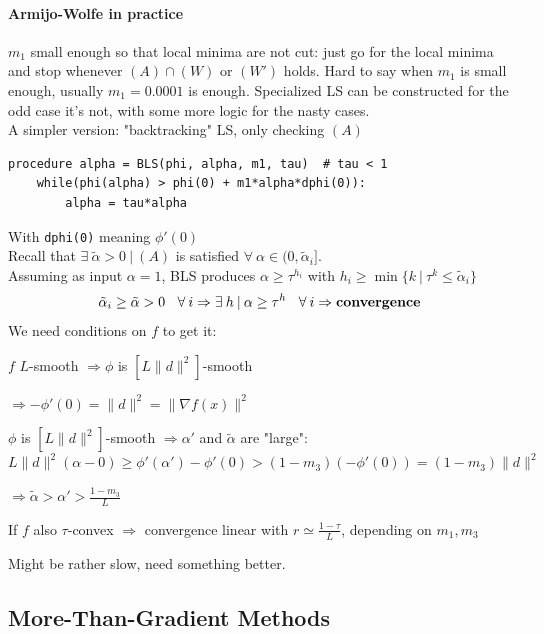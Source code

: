 \documentclass[10pt]{report}
\begin{document}
\paragraph{Armijo-Wolfe in practice} $m_1$ small enough so that local minima are not cut: just go for the local minima and stop whenever $(A)\cap (W)$ or $(W')$ holds. Hard to say when $m_1$ is small enough, usually $m_1 = 0.0001$ is enough. Specialized LS can be constructed for the odd case it's not, with some more logic for the nasty cases.\\
A simpler version: "backtracking" LS, only checking $(A)$
\begin{lstlisting}[style=myPython]
procedure alpha = BLS(phi, alpha, m1, tau)  # tau < 1
	while(phi(alpha) > phi(0) + m1*alpha*dphi(0)):
		alpha = tau*alpha
\end{lstlisting}
With \texttt{dphi(0)} meaning $\phi'(0)$\\
Recall that $\exists\:\tilde{\alpha} > 0\:|\:(A)$ is satisfied $\forall\:\alpha\in(0,\tilde{\alpha}_i]$.\\Assuming as input $\alpha = 1$, BLS produces $\alpha\geq \tau^{h_i}$ with $h_i\geq \min\{k\:|\:\tau^k\leq \tilde{\alpha}_i\}$
$$\tilde{\alpha}_i \geq \tilde{\alpha} > 0\:\:\:\:\forall\:i\Rightarrow\exists\:h\:|\:\alpha\geq\tau^h\:\:\:\:\forall\:i\Rightarrow \text{\textbf{convergence}}$$
We need conditions on $f$ to get it:
\begin{list}{}{}
	\item $f$ $L$-smooth $\Rightarrow \phi$ is $[L\|d\|^2]$-smooth
	\item $\Rightarrow -\phi'(0) = \|d\|^2 = \|\nabla f(x)\|^2$
	\item $\phi$ is $[L\|d\|^2]$-smooth $\Rightarrow \alpha'$ and $\tilde{\alpha}$ are "large":\\
	$L\|d\|^2(\alpha - 0)\geq \phi'(\alpha')-\phi'(0) > (1-m_3)(-\phi'(0)) = (1-m_3)\|d\|^2$
	\item $\Rightarrow \tilde{\alpha} > \alpha' > \frac{1-m_3}{L}$
	\item If $f$ also $\tau$-convex $\Rightarrow$ convergence linear with $r\simeq \frac{1-\tau}{L}$, depending on $m_1,m_3$
\end{list}
Might be rather slow, need something better.
\subsection{More-Than-Gradient Methods}
\end{document}
